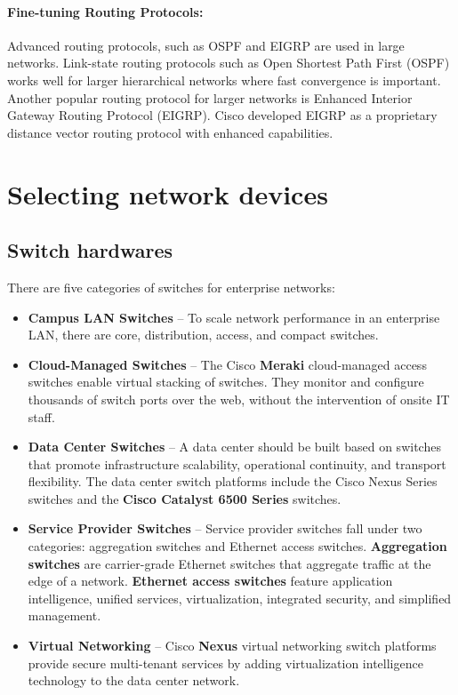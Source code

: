 \paragraph{Fine-tuning Routing Protocols:} Advanced routing protocols, such as OSPF and EIGRP are used in large networks. Link-state routing protocols such as Open Shortest Path First (OSPF) works well for larger hierarchical networks where fast convergence is important. Another popular routing protocol for larger networks is Enhanced Interior Gateway Routing Protocol (EIGRP). Cisco developed EIGRP as a proprietary distance vector routing protocol with enhanced capabilities.

\section{Selecting network devices}

\subsection{Switch hardwares}

There are five categories of switches for enterprise networks:

\begin{itemize}
\item \textbf{Campus LAN Switches} -- To scale network performance in an enterprise LAN, there are core, distribution, access, and compact switches.
\item \textbf{Cloud-Managed Switches} -- The Cisco \textbf{Meraki} cloud-managed access switches enable virtual stacking of switches. They monitor and configure thousands of switch ports over the web, without the intervention of onsite IT staff.

\item \textbf{Data Center Switches} -- A data center should be built based on switches that promote infrastructure scalability, operational continuity, and transport flexibility. The data center switch platforms include the Cisco Nexus Series switches and the \textbf{Cisco Catalyst 6500 Series} switches.

\item \textbf{Service Provider Switches} -- Service provider switches fall under two categories: aggregation switches and Ethernet access switches. \textbf{Aggregation switches} are carrier-grade Ethernet switches that aggregate traffic at the edge of a network. \textbf{Ethernet access switches} feature application intelligence, unified services, virtualization, integrated security, and simplified management.

\item \textbf{Virtual Networking} -- Cisco \textbf{Nexus} virtual networking switch platforms provide secure multi-tenant services by adding virtualization intelligence technology to the data center network.
\end{itemize}

